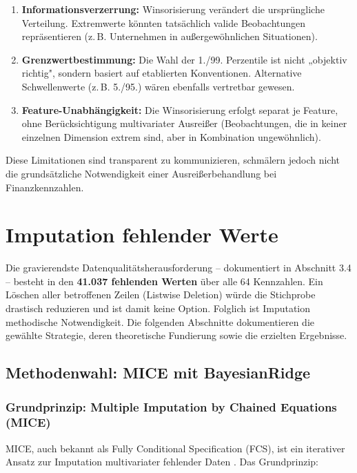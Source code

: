 \begin{enumerate}[topsep=0.2\baselineskip]
    \item \textbf{Informationsverzerrung:} Winsorisierung verändert die ursprüngliche Verteilung. Extremwerte könnten tatsächlich valide Beobachtungen repräsentieren (z.\,B. Unternehmen in außergewöhnlichen Situationen).
    \item \textbf{Grenzwertbestimmung:} Die Wahl der 1./99. Perzentile ist nicht „objektiv richtig", sondern basiert auf etablierten Konventionen. Alternative Schwellenwerte (z.\,B. 5./95.) wären ebenfalls vertretbar gewesen.
    \item \textbf{Feature-Unabhängigkeit:} Die Winsorisierung erfolgt separat je Feature, ohne Berücksichtigung multivariater Ausreißer (Beobachtungen, die in keiner einzelnen Dimension extrem sind, aber in Kombination ungewöhnlich).
\end{enumerate}

Diese Limitationen sind transparent zu kommunizieren, schmälern jedoch nicht die grundsätzliche Notwendigkeit einer Ausreißerbehandlung bei Finanzkennzahlen.

\section{Imputation fehlender Werte}

Die gravierendste Datenqualitätsherausforderung – dokumentiert in Abschnitt 3.4 – besteht in den \textbf{41.037 fehlenden Werten} über alle 64 Kennzahlen. Ein Löschen aller betroffenen Zeilen (Listwise Deletion) würde die Stichprobe drastisch reduzieren und ist damit keine Option. Folglich ist Imputation methodische Notwendigkeit. Die folgenden Abschnitte dokumentieren die gewählte Strategie, deren theoretische Fundierung sowie die erzielten Ergebnisse.

\subsection{Methodenwahl: MICE mit BayesianRidge}

\subsubsection{Grundprinzip: Multiple Imputation by Chained Equations (MICE)}

MICE, auch bekannt als Fully Conditional Specification (FCS), ist ein iterativer Ansatz zur Imputation multivariater fehlender Daten \parencite{vanbuuren2011mice}. Das Grundprinzip:

